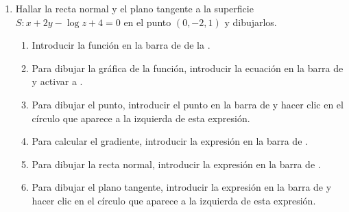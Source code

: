 \begin{enumerate}[leftmargin=*]

\item Hallar la recta normal y el plano tangente a la superficie $S: x+2y-\log z +4 =0$ en el punto $(0,-2,1)$ y dibujarlos.
      \begin{indication}
      \begin{enumerate}
      \item Introducir la función  en la barra de  de la .
      \item Para dibujar la gráfica de la función, introducir la ecuación  en la barra de  y activar a .
      \item Para dibujar el punto, introducir el punto  en la barra de  y hacer clic en el círculo que aparece a la izquierda de esta expresión.
      \item Para calcular el gradiente, introducir la expresión  en la barra de .
      \item Para dibujar la recta normal, introducir la expresión  en la barra de .
      \item Para dibujar el plano tangente, introducir la expresión  en la barra de  y hacer clic en el círculo que aparece a la izquierda de esta expresión.
      \end{enumerate}
      \end{indication}


\end{enumerate}
